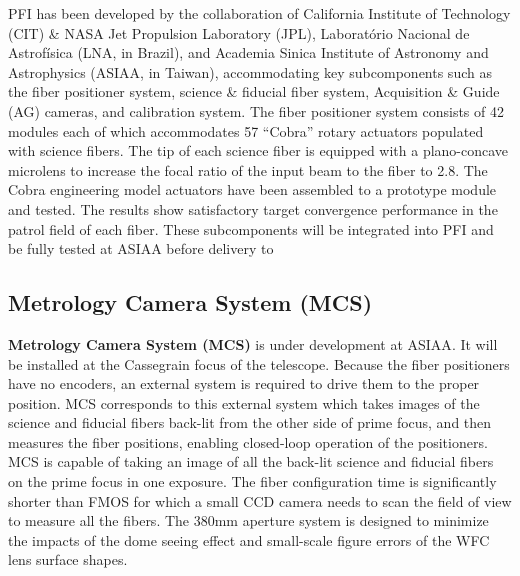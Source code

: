 \documentclass[a4paper]{article}
\begin{document}
PFI has been developed by the collaboration of California Institute of
Technology (CIT) \& NASA Jet Propulsion Laboratory (JPL),
Laborat\'{o}rio Nacional de Astrof\'{i}sica (LNA, in Brazil), and
Academia Sinica Institute of Astronomy and Astrophysics (ASIAA, in
Taiwan), accommodating key subcomponents such as the fiber positioner
system, science \& fiducial fiber system, Acquisition \& Guide (AG)
cameras, and calibration system\cite{wang16pfi}. The fiber positioner
system consists of 42 modules each of which accommodates 57 ``Cobra''
rotary actuators populated with science fibers. The tip of each
science fiber is equipped with a plano-concave microlens to increase
the focal ratio of the input beam to the fiber to
2.8\cite{takato14}. The Cobra engineering model actuators have been
assembled to a prototype module and tested. The results show
satisfactory target convergence performance in the patrol field of
each fiber\cite{fisher14}. These subcomponents will be integrated into
PFI and be fully tested at ASIAA before delivery to

\subsection{Metrology Camera System (MCS)\label{sec:pfs_system:mcs}}

{\bf Metrology Camera System (MCS)} is under development at
ASIAA\cite{wang16mcs}. It will be installed at the Cassegrain focus of
the telescope. Because the fiber positioners have no encoders, an
external system is required to drive them to the proper position.  MCS
corresponds to this external system which takes images of the science
and fiducial fibers back-lit from the other side of prime focus, and
then measures the fiber positions, enabling closed-loop operation of
the positioners. MCS is capable of taking an image of all the back-lit
science and fiducial fibers on the prime focus in one exposure. The
fiber configuration time is significantly shorter than FMOS for which
a small CCD camera needs to scan the field of view to measure all the
fibers. The 380mm aperture system is designed to minimize the impacts
of the dome seeing effect and small-scale figure errors of the WFC
lens surface shapes.
\end{document}

